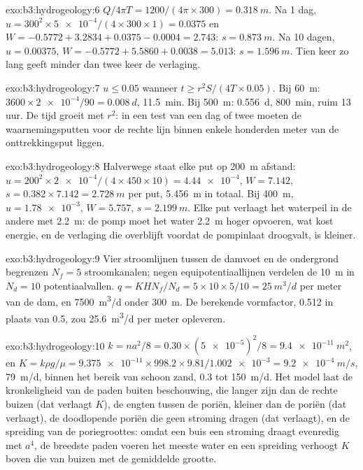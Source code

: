 \begin{solution}{exo:b3:hydrogeology:6}
$Q/4\pi T = 1200/(4\pi\times300) = \qty{0.318}{m}$. Na 1 dag, $u =
300^2\times\num{5e-4}/(4\times300\times1) = \num{0.0375}$ en $W = -0.5772
+ 3.2834 + 0.0375 - 0.0004 = \num{2.743}$: $s = \qty{0.873}{m}$. Na 10
dagen, $u = \num{0.00375}$, $W = -0.5772 + 5.5860 + 0.0038 = \num{5.013}$:
$s = \qty{1.596}{m}$. Tien keer zo lang geeft minder dan twee keer de
verlaging.
\end{solution}

\begin{solution}{exo:b3:hydrogeology:7}
$u \le 0.05$ wanneer $t \ge r^2S/(4T\times0.05)$. Bij \qty{60}{m}: $3600\times
\num{2e-4}/90 = \qty{0.008}{d}$, \qty{11.5}{min}. Bij \qty{500}{m}:
\qty{0.556}{d}, \qty{800}{min}, ruim 13 uur. De tijd groeit met $r^2$:
in een test van een dag of twee moeten de waarnemingsputten voor de rechte
lijn binnen enkele honderden meter van de onttrekkingsput liggen.
\end{solution}

\begin{solution}{exo:b3:hydrogeology:8}
Halverwege staat elke put op \qty{200}{m} afstand: $u = 200^2\times\num{2e-4}/(4
\times450\times10) = \num{4.44e-4}$, $W = \num{7.142}$, $s = 0.382\times
7.142 = \qty{2.728}{m}$ per put, \qty{5.456}{m} in totaal. Bij
\qty{400}{m}, $u = \num{1.78e-3}$, $W = \num{5.757}$, $s =
\qty{2.199}{m}$. Elke put verlaagt het waterpeil in de andere met
\qty{2.2}{m}: de pomp moet het water \qty{2.2}{m} hoger opvoeren, wat
kost energie, en de verlaging die overblijft voordat de pompinlaat droogvalt, is
kleiner.
\end{solution}

\begin{solution}{exo:b3:hydrogeology:9}
Vier stroomlijnen tussen de damvoet en de ondergrond begrenzen $N_f = 5$
stroomkanalen; negen equipotentiaallijnen verdelen de \qty{10}{m} in $N_d = 10$
potentiaalvallen. $q = KHN_f/N_d = 5\times10\times5/10 = \qty{25}{m^3/d}$ per meter
van de dam, en \qty{7500}{m^3/d} onder \qty{300}{m}. De berekende
vormfactor, 0.512 in plaats van 0.5, zou \qty{25.6}{m^3/d} per meter opleveren.
\end{solution}

\begin{solution}{exo:b3:hydrogeology:10}
$k = na^2/8 = 0.30\times(\num{5e-5})^2/8 = \qty{9.4e-11}{m^2}$, en $K =
k\rho g/\mu = \num{9.375e-11}\times998.2\times9.81/\num{1.002e-3} =
\qty{9.2e-4}{m/s}$, \qty{79}{m/d}, binnen het bereik van schoon zand, 0.3 tot
\qty{150}{m/d}. Het model laat de kronkeligheid van de paden buiten beschouwing, die langer zijn
dan de rechte buizen (dat verlaagt $K$), de engten tussen de poriën,
kleiner dan de poriën (dat verlaagt), de doodlopende poriën die geen
stroming dragen (dat verlaagt), en de spreiding van de poriegroottes: omdat een buis een
stroming draagt evenredig met $a^4$, de breedste paden voeren het meeste water en
een spreiding verhoogt $K$ boven die van buizen met de gemiddelde grootte.
\end{solution}

